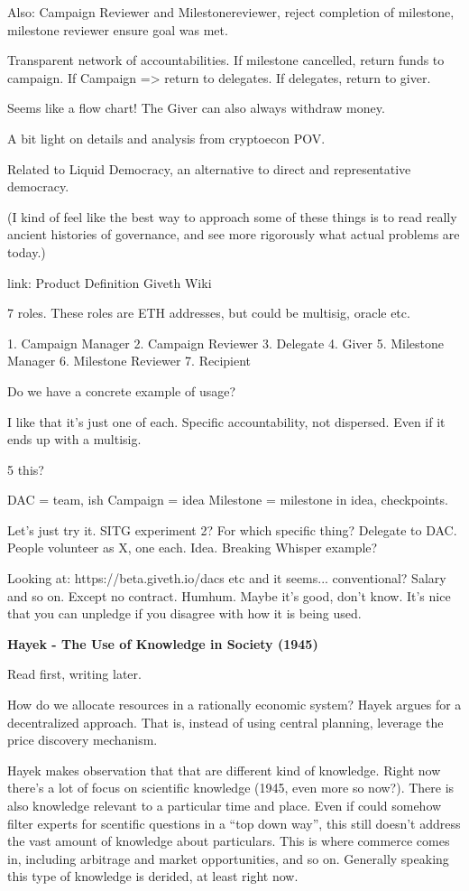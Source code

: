 \documentclass[12pt]{report}
\begin{document}
Also: Campaign Reviewer and Milestonereviewer, reject completion of milestone,
milestone reviewer ensure goal was met.

Transparent network of accountabilities. If milestone cancelled, return funds to campaign. If Campaign => return to delegates. If delegates, return to giver.

Seems like a flow chart! The Giver can also always withdraw money.

A bit light on details and analysis from cryptoecon POV.

Related to Liquid Democracy, an alternative to direct and representative democracy.

(I kind of feel like the best way to approach some of these things is to read really ancient histories of governance, and see more rigorously what actual problems are today.)

link: Product Definition Giveth Wiki

7 roles. These roles are ETH addresses, but could be multisig, oracle etc.

1. Campaign Manager
2. Campaign Reviewer
3. Delegate
4. Giver
5. Milestone Manager
6. Milestone Reviewer
7. Recipient

Do we have a concrete example of usage?

I like that it's just one of each. Specific accountability, not dispersed. Even if it ends up with a multisig.

5%
this?

DAC = team, ish
Campaign = idea
Milestone = milestone in idea, checkpoints.

Let's just try it. SITG experiment 2? For which specific thing? Delegate to DAC. People volunteer as X, one each. Idea. Breaking Whisper example?

Looking at: https://beta.giveth.io/dacs etc and it seems... conventional? Salary
and so on. Except no contract. Humhum. Maybe it's good, don't know. It's nice that you can unpledge if you disagree with how it is being used.

\textbf{Hayek - The Use of Knowledge in Society (1945)}

Read first, writing later.

How do we allocate resources in a rationally economic system? Hayek argues for a decentralized approach. That is, instead of using central planning, leverage the price discovery mechanism.

Hayek makes observation that that are different kind of knowledge. Right now
there's a lot of focus on scientific knowledge (1945, even more so now?). There
is also knowledge relevant to a particular time and place. Even if could somehow
filter experts for scentific questions in a ``top down way'', this still doesn't
address the vast amount of knowledge about particulars. This is where commerce
comes in, including arbitrage and market opportunities, and so on. Generally
speaking this type of knowledge is derided, at least right now.
\end{document}
